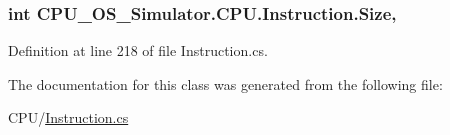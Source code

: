 \subsubsection[{Size}]{\setlength{\rightskip}{0pt plus 5cm}int C\+P\+U\+\_\+\+O\+S\+\_\+\+Simulator.\+C\+P\+U.\+Instruction.\+Size\hspace{0.3cm}{\ttfamily [get]}, {\ttfamily [set]}}\label{class_c_p_u___o_s___simulator_1_1_c_p_u_1_1_instruction_a7c60418808e7bd6cb1964a227dcd9dac}


Definition at line 218 of file Instruction.\+cs.



The documentation for this class was generated from the following file\+:\begin{DoxyCompactItemize}
\item 
C\+P\+U/\hyperlink{_instruction_8cs}{Instruction.\+cs}\end{DoxyCompactItemize}

